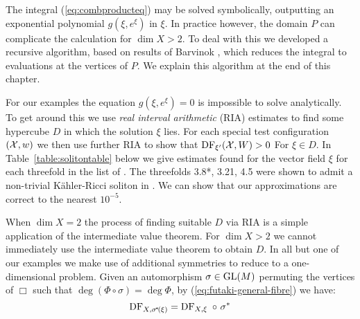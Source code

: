 The integral (\ref{eq:combproducteq}) may be solved symbolically, outputting an exponential polynomial \(g(\xi, e^{\xi})\) in \(\xi\). In practice however, the domain \(P\) can complicate the calculation for \(\dim X > 2\). To deal with this we developed a recursive algorithm, based on results of Barvinok \cite{Barvinok1992}, which reduces the integral to evaluations at the vertices of \(P\). We explain this algorithm at the end of this chapter.

For our examples the equation \(g(\xi,e^{\xi}) = 0\) is impossible to solve analytically. To get around this we use \textit{real interval arithmetic} (RIA) estimates to find some hypercube \(D\) in which the solution \(\xi\) lies. For each special test configuration \(({\mathcal{X}},w)\) we then use further RIA to show that \(\mathop{\rm DF}\nolimits_{\xi'}({\mathcal{X}},W)>0\) For \(\xi \in D\). In Table~\ref{table:solitontable} below we give estimates found for the vector field \(\xi\) for each threefold in the list of \cite{suss2013fano}. The threefolds 3.8*, 3.21, 4.5 were shown to admit a non-trivial K\"ahler-Ricci soliton in \cite{ilten2015}. We can show that our approximations are correct to the nearest \(10^{-5}\).

When \(\dim  X = 2\) the process of finding suitable \(D\) via RIA is a simple application of the intermediate value theorem. For \(\dim X >2 \) we cannot immediately use the intermediate value theorem to obtain \(D\). In all but one of our examples we make use of additional symmetries to reduce to a one-dimensional problem. Given an automorphism \(\sigma \in \operatorname{GL}(M)\) permuting the vertices of \(\Box\) such that \(\deg (\Phi \circ \sigma) = \deg \Phi\), by (\ref{eq:futaki-general-fibre}) we have:
\[
\mathop{\rm DF}\nolimits_{X, \sigma^{\!*}\!(\xi)}  =  \mathop{\rm DF}\nolimits_{X, \xi} \ \circ \ \sigma^*
\]

